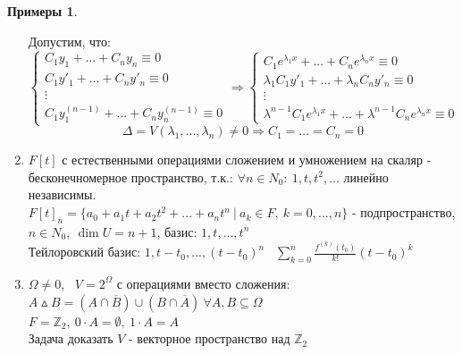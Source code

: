 \documentclass[a4paper, 12pt]{article}
\newcommand{\Z}{\mathbb Z}
\theoremstyle{definition}
\newtheorem*{example}{Примеры}
\theoremstyle{plain}
\theoremstyle{remark}
\begin{document}
\begin{example}
\begin{enumerate}
      Допустим, что:
      $$\begin{cases}
        C_1y_1 + ... + C_ny_n \equiv 0\\
        C_1y'_1 + ... + C_ny'_n \equiv 0\\
        \vdots\\
        C_1y_1^{(n-1)} + ... + C_ny_n^{(n-1)} \equiv 0
      \end{cases} \Longrightarrow \begin{cases}
        C_1e^{\lambda_1x} + ... + C_ne^{\lambda_nx} \equiv 0\\
        \lambda_1C_1y'_1 + ... + \lambda_nC_ny'_n \equiv 0\\
        \vdots\\
        \lambda^{n-1}C_1e^{\lambda_1x} + ... + \lambda^{n-1}C_ne^{\lambda_nx} \equiv 0
      \end{cases}$$
      $$\Delta = V(\lambda_1,...,\lambda_n) \neq 0 \Longrightarrow C_1 = ... = C_n = 0$$
      \item $F[t]$ с естественными операциями сложением и умножением на скаляр - бесконечномерное пространство, т.к.: $\forall n \in N_0: \ 1, t, t^2,...$ линейно независимы.\\
      $F[t]_n = \{a_0+a_1t+a_2t^2+...+a_nt^n \ | \ a_k\in F, \ k=0,...,n\} $ - подпространство, $n \in N_0, \ \dim U = n+1$, базис: $1,t,...,t^n$\\
      Тейлоровский базис: $1, t-t_0,...,(t-t_0)^n$ \ $\sum \limits_{k=0}^n\frac{f^{(k)}(t_0)}{k!}(t-t_0)^k$ 
      \item $\varOmega \neq 0$, \ $V = 2^\varOmega $ с операциями вместо сложения: \\
      $A\vartriangle B = (A\cap \overline{B}) \cup (B\cap \overline{A}) \ \forall A,B \subseteq \varOmega$\\
      $F = \Z_2,  \ 0\cdot A = \emptyset , \ 1 \cdot A = A$\\
      Задача доказать $V$ - векторное пространство над $\Z_2$  
    \end{enumerate}
  \end{example}
\end{document}
